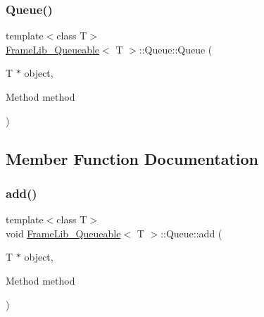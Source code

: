 \mbox{\label{class_frame_lib___queueable_1_1_queue_af701d261343c894ba4cde0aa8dd99bd1}} 
\subsubsection{\texorpdfstring{Queue()}{Queue()}\hspace{0.1cm}{\footnotesize\ttfamily [2/2]}}
{\footnotesize\ttfamily template$<$class T$>$ \\
\hyperlink{class_frame_lib___queueable}{Frame\+Lib\+\_\+\+Queueable}$<$ T $>$\+::Queue\+::\+Queue (\begin{DoxyParamCaption}\item[{T $\ast$}]{object,  }\item[{Method}]{method }\end{DoxyParamCaption})\hspace{0.3cm}{\ttfamily [inline]}}



\subsection{Member Function Documentation}
\mbox{\label{class_frame_lib___queueable_1_1_queue_abf0d41d8f1e7988e1bde9b8a5f899f30}} 
\subsubsection{\texorpdfstring{add()}{add()}}
{\footnotesize\ttfamily template$<$class T$>$ \\
void \hyperlink{class_frame_lib___queueable}{Frame\+Lib\+\_\+\+Queueable}$<$ T $>$\+::Queue\+::add (\begin{DoxyParamCaption}\item[{T $\ast$}]{object,  }\item[{Method}]{method }\end{DoxyParamCaption})\hspace{0.3cm}{\ttfamily [inline]}}

